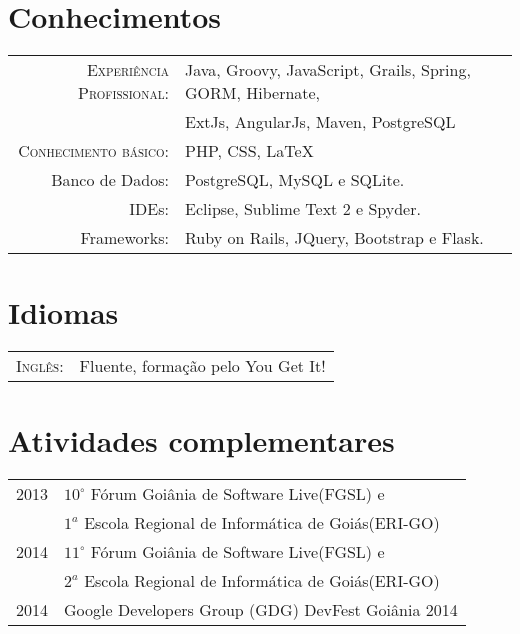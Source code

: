 \documentclass[a4paper,10pt]{article} %
\begin{document}
\section{Conhecimentos}

\begin{tabular}{rl}
	\textsc{Experiência Profissional:} & 
	Java, Groovy, JavaScript, Grails, Spring, GORM, Hibernate, \\
	& ExtJs, AngularJs, Maven, PostgreSQL\\

	\textsc{Conhecimento básico:} & PHP, CSS, \LaTeX\\
	Banco de Dados: & PostgreSQL, MySQL e SQLite. \\

	IDEs: & Eclipse, Sublime Text 2 e Spyder. \\

	Frameworks: & Ruby on Rails, JQuery, Bootstrap e Flask. \\

\end{tabular}


\section{Idiomas}

\begin{tabular}{rl}
	\textsc{Inglês:} & Fluente, formação pelo You Get It!\\
\end{tabular}


\section{Atividades complementares}

\begin{tabular}{rl}
	2013 & $10^{\circ}$ Fórum Goiânia de Software Live(FGSL) e \\
	& $1^{a}$ Escola Regional de Informática de Goiás(ERI-GO)\\

	2014 & $11^{\circ}$ Fórum Goiânia de Software Live(FGSL) e \\
	& $2^{a}$ Escola Regional de Informática de Goiás(ERI-GO)\\

	2014 & Google Developers Group (GDG) DevFest Goiânia 2014\\
\end{tabular}
\end{document}
